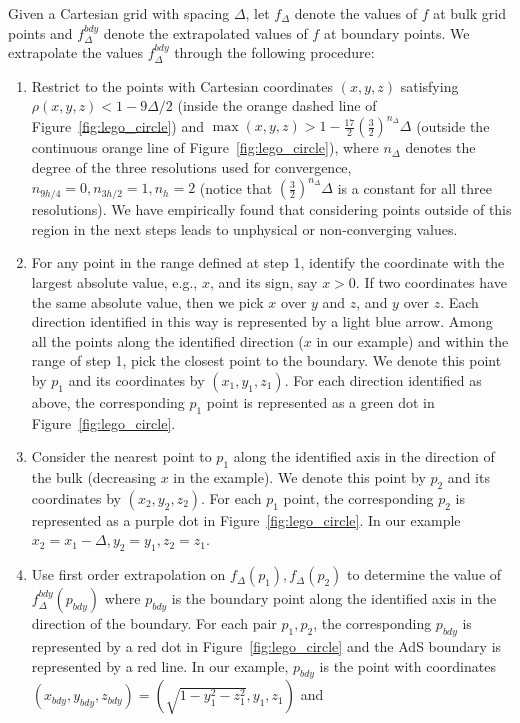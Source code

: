 \documentclass[a4paper,11pt]{article}
\numberwithin{equation}{section}
\begin{document}
Given a Cartesian grid with spacing $\Delta$, let $f_\Delta$ denote the values of $f$ at bulk grid points and $f^{bdy}_{\Delta}$ denote the extrapolated values of $f$ at boundary points. 
We extrapolate the values $f^{bdy}_{\Delta}$ through the following procedure:
 \begin{enumerate}
 \item Restrict to the points with Cartesian coordinates $(x,y,z)$ satisfying $\rho(x,y,z)<1-9\Delta/2$ (inside the orange dashed line of Figure~\ref{fig:lego_circle}) and $\max(x,y,z)>1-\frac{17}{2}\left(\frac{3}{2}\right)^{n_\Delta}\Delta$ (outside the continuous orange line of Figure~\ref{fig:lego_circle}), where $n_\Delta$ denotes the degree of the three resolutions used for convergence, $n_{9h/4}=0,n_{3h/2}=1,n_{h}=2$ (notice that $\left(\frac{3}{2}\right)^{n_\Delta}\Delta$ is a constant for all three resolutions). We have empirically found that considering points outside of this region in the next steps leads to unphysical or non-converging values.
 \item For any point in the range defined at step 1, identify the coordinate with the largest absolute value, e.g., $x$, and its sign, say $x>0$. If two coordinates have the same absolute value, then we pick $x$ over $y$ and $z$, and $y$ over $z$. Each direction identified in this way is represented by a light blue arrow. Among all the points along the identified direction ($x$ in our example) and within the range of step 1, pick the closest point to the boundary. We denote this point by $p_1$ and its coordinates by $(x_1,y_1,z_1)$. For each direction identified as above, the corresponding $p_1$ point is represented as a green dot in Figure~\ref{fig:lego_circle}.
 \item Consider the nearest point to $p_1$ along the identified axis in the direction of the bulk (decreasing $x$ in the example). We denote this point by $p_2$ and its coordinates by $(x_2,y_2,z_2)$. For each $p_1$ point, the corresponding $p_2$ is represented as a purple dot in Figure~\ref{fig:lego_circle}. In our example $x_2=x_1-\Delta,y_2=y_1,z_2=z_1$.
 \item Use first order extrapolation on $f_\Delta(p_1),f_\Delta(p_{2})$ to determine the value of $f^{bdy}_{\Delta}(p_{bdy})$ where $p_{bdy}$ is the boundary point along the identified axis in the direction of the boundary.  
For each pair $p_1,p_2$, the corresponding $p_{bdy}$ is represented by a red dot in Figure~\ref{fig:lego_circle} and the AdS boundary is represented by a red line.
In our example, $p_{bdy}$ is the point with coordinates $(x_{bdy},y_{bdy},z_{bdy})=(\sqrt{1-y_1^2-z_1^2},y_1,z_1)$ and

\end{enumerate}
\end{document}
